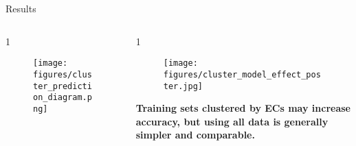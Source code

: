 \documentclass[final]{beamer}
\newlength{\onecolwid}
\newlength{\twocolwid}
\begin{document}
\begin{frame}[t]
\begin{columns}[t]
\begin{column}{\twocolwid}
\begin{block}{Results}
\begin{columns}[t,totalwidth=\twocolwid] %

\begin{column}{1\onecolwid} %


\begin{figure}
  \texttt{[image: figures/cluster\_prediction\_diagram.png]}
\end{figure}


\end{column} %




\begin{column}{1\onecolwid} %



\begin{figure}
  \texttt{[image: figures/cluster\_model\_effect\_poster.jpg]}
\end{figure}

\vspace{0.5cm}

\begin{footnotesize}

\textbf{Training sets clustered by ECs may increase accuracy, but using all data is generally simpler and comparable.}

\end{footnotesize}




\end{column} %

\end{columns} %





\vspace{1cm}


\end{block}




\begin{columns}[t,totalwidth=\twocolwid] %


\end{columns}
\end{column}
\end{columns}
\end{frame}
\end{document}
